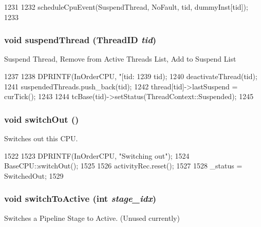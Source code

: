 \begin{DoxyCode}
1231 {
1232     scheduleCpuEvent(SuspendThread, NoFault, tid, dummyInst[tid]);
1233 }
\end{DoxyCode}
\hypertarget{classInOrderCPU_aee7a498a20266fbfbc6aa3f165577b68}{
\subsubsection[{suspendThread}]{\setlength{\rightskip}{0pt plus 5cm}void suspendThread ({\bf ThreadID} {\em tid})}}
\label{classInOrderCPU_aee7a498a20266fbfbc6aa3f165577b68}
Suspend Thread, Remove from Active Threads List, Add to Suspend List 


\begin{DoxyCode}
1237 {
1238     DPRINTF(InOrderCPU, "[tid:%
1239             tid);
1240     deactivateThread(tid);
1241     suspendedThreads.push_back(tid);    
1242     thread[tid]->lastSuspend = curTick();    
1243 
1244     tcBase(tid)->setStatus(ThreadContext::Suspended);    
1245 }
\end{DoxyCode}
\hypertarget{classInOrderCPU_a05f299b443f8cc73a93d61572edc0218}{
\subsubsection[{switchOut}]{\setlength{\rightskip}{0pt plus 5cm}void switchOut ()}}
\label{classInOrderCPU_a05f299b443f8cc73a93d61572edc0218}
Switches out this CPU. 


\begin{DoxyCode}
1522 {
1523     DPRINTF(InOrderCPU, "Switching out\n");
1524     BaseCPU::switchOut();
1525 
1526     activityRec.reset();
1527 
1528     _status = SwitchedOut;
1529 }
\end{DoxyCode}
\hypertarget{classInOrderCPU_a20899487e4c954b6f0af2a5fc0a6cc6b}{
\subsubsection[{switchToActive}]{\setlength{\rightskip}{0pt plus 5cm}void switchToActive (int {\em stage\_\-idx})}}
\label{classInOrderCPU_a20899487e4c954b6f0af2a5fc0a6cc6b}
Switches a Pipeline Stage to Active. (Unused currently) 


